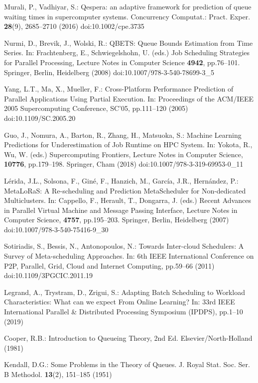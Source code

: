 Murali, P., Vadhiyar, S.: Qespera: an adaptive framework for prediction of queue waiting times in supercomputer systems. Concurrency Computat.: Pract. Exper. \textbf{28}(9), 2685--2710 (2016) doi:10.1002/cpe.3735

Nurmi, D., Brevik, J., Wolski, R.: QBETS: Queue Bounds Estimation from Time Series. In: Frachtenberg, E., Schwiegelshohn, U. (eds.) Job Scheduling Strategies for Parallel Processing, Lecture Notes in Computer Science \textbf{4942}, pp.76--101. Springer, Berlin, Heidelberg (2008) doi:10.1007/978-3-540-78699-3\_5

Yang, L.T., Ma, X., Mueller, F.: Cross-Platform Performance Prediction of Parallel Applications Using Partial Execution. In: Proceedings of the ACM/IEEE 2005 Supercomputing Conference, SC'05, pp.111--120 (2005) doi:10.1109/SC.2005.20

Guo, J., Nomura, A., Barton, R., Zhang, H., Matsuoka, S.: Machine Learning Predictions for Underestimation of Job Runtime on HPC System. In: Yokota, R., Wu, W. (eds.) Supercomputing Frontiers, Lecture Notes in Computer Science, \textbf{10776}, pp.179--198. Springer, Cham (2018) doi:10.1007/978-3-319-69953-0\_11

Lérida, J.L., Solsona, F., Giné, F., Hanzich, M., García, J.R., Hernández, P.: MetaLoRaS: A Re-scheduling and Prediction MetaScheduler for Non-dedicated Multiclusters. In: Cappello, F., Herault, T., Dongarra, J. (eds.) Recent Advances in Parallel Virtual Machine and Message Passing Interface, Lecture Notes in Computer Science, \textbf{4757}, pp.195--203. Springer, Berlin, Heidelberg (2007) doi:10.1007/978-3-540-75416-9\_30

Sotiriadis, S., Bessis, N., Antonopoulos, N.: Towards Inter-cloud Schedulers: A Survey of Meta-scheduling Approaches. In: 6th IEEE International Conference on P2P, Parallel, Grid, Cloud and Internet Computing, pp.59--66 (2011) doi:10.1109/3PGCIC.2011.19

Legrand, A., Trystram, D., Zrigui, S.: Adapting Batch Scheduling to Workload Characteristics: What can we expect From Online Learning? In: 33rd IEEE International Parallel \& Distributed Processing Symposium (IPDPS), pp.1--10 (2019)

Cooper, R.B.: Introduction to Queueing Theory, 2nd Ed. Elsevier/North-Holland (1981)

Kendall, D.G.: Some Problems in the Theory of Queues. J. Royal Stat. Soc. Ser. B Methodol. \textbf{13}(2), 151--185 (1951)

